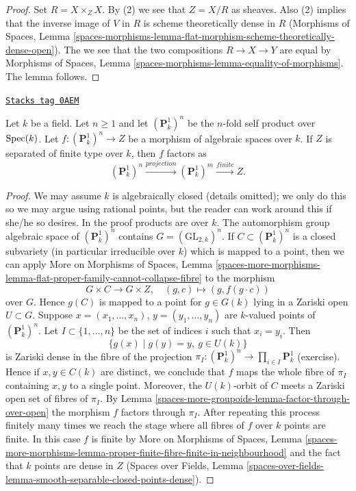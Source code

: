 \begin{proof}
Set $R = X \times_Z X$. By (2) we see that $Z = X/R$ as sheaves.
Also (2) implies that the inverse image of $V$ in $R$ is scheme
theoretically dense in $R$ (Morphisms of Spaces, Lemma
\ref{spaces-morphisms-lemma-flat-morphism-scheme-theoretically-dense-open}).
The we see that the two compositions
$R \to X \to Y$ are equal by Morphisms of Spaces, Lemma
\ref{spaces-morphisms-lemma-equality-of-morphisms}.
The lemma follows.
\end{proof}

\begin{lemma}
\label{spaces-more-groupoids-lemma-quotient-power-P1}
\href{https://stacks.math.columbia.edu/tag/0AEM}{\texttt{Stacks tag 0AEM}}


Let $k$ be a field. Let $n \geq 1$ and let $(\mathbf{P}^1_k)^n$
be the $n$-fold self product over $\operatorname{Spec}(k)$. Let
$f : (\mathbf{P}^1_k)^n \to Z$ be a morphism of algebraic spaces over $k$.
If $Z$ is separated of finite type over $k$, then $f$ factors as
$$
(\mathbf{P}^1_k)^n \xrightarrow{projection}
(\mathbf{P}^1_k)^m \xrightarrow{finite} Z.
$$
\end{lemma}

\begin{proof}
We may assume $k$ is algebraically closed (details omitted); we only
do this so we may argue using rational points, but the reader can work
around this if she/he so desires. In the proof products are over $k$.
The automorphism group algebraic space of $(\mathbf{P}^1_k)^n$ contains
$G = (\text{GL}_{2, k})^n$. If $C \subset (\mathbf{P}^1_k)^n$ is a
closed subvariety (in particular irreducible over $k$) which is mapped
to a point, then we can apply
More on Morphisms of Spaces,
Lemma \ref{spaces-more-morphisms-lemma-flat-proper-family-cannot-collapse-fibre}
to the morphism
$$
G \times C \to G \times Z,\quad (g, c) \mapsto (g, f(g \cdot c))
$$
over $G$. Hence $g(C)$ is mapped to a point for $g \in G(k)$
lying in a Zariski open $U \subset G$. Suppose
$x = (x_1, \ldots, x_n)$, $y = (y_1, \ldots, y_n)$
are $k$-valued points of $(\mathbf{P}^1_k)^n$. Let
$I \subset \{1, \ldots, n\}$ be the set of indices $i$
such that $x_i = y_i$. Then
$$
\{g(x) \mid g(y) = y,\ g \in U(k)\}
$$
is Zariski dense in the fibre of the projection
$\pi_I : (\mathbf{P}^1_k)^n \to \prod_{i \in I} \mathbf{P}^1_k$
(exercise). Hence if $x, y \in C(k)$ are distinct, we conclude
that $f$ maps the whole fibre of $\pi_I$ containing $x, y$ to a
single point. Moreover, the $U(k)$-orbit of $C$ meets a Zariski
open set of fibres of $\pi_I$. By Lemma \ref{spaces-more-groupoids-lemma-factor-through-over-open}
the morphism $f$ factors through $\pi_I$.
After repeating this process finitely many times we reach
the stage where all fibres of $f$ over $k$ points are finite.
In this case $f$ is finite by
More on Morphisms of Spaces, Lemma
\ref{spaces-more-morphisms-lemma-proper-finite-fibre-finite-in-neighbourhood}
and the fact that $k$ points are dense in $Z$
(Spaces over Fields, Lemma
\ref{spaces-over-fields-lemma-smooth-separable-closed-points-dense}).
\end{proof}

